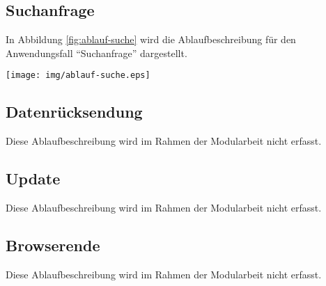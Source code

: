 \subsection{Suchanfrage}

In Abbildung \ref{fig:ablauf-suche} wird die Ablaufbeschreibung für den
Anwendungsfall \enquote{Suchanfrage} dargestellt.
\\[\intextsep]
\begin{minipage}{\linewidth}
\centering%
\texttt{[image: img/ablauf-suche.eps]}%
%
\label{fig:ablauf-suche}%
\end{minipage}

\newpage

\subsection{Datenrücksendung}

Diese Ablaufbeschreibung wird im Rahmen der Modularbeit nicht erfasst.

\subsection{Update}

Diese Ablaufbeschreibung wird im Rahmen der Modularbeit nicht erfasst.

\subsection{Browserende}

Diese Ablaufbeschreibung wird im Rahmen der Modularbeit nicht erfasst.

